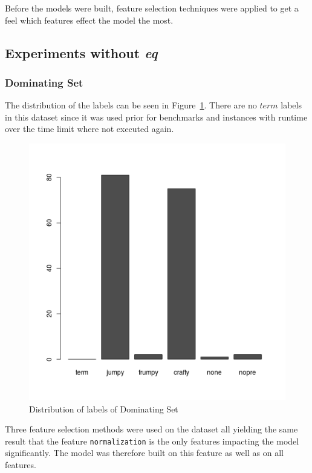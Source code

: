 Before the models were built, feature selection techniques were applied to get a feel which features effect the model the most.

\subsection{Experiments without \emph{eq}}
\subsubsection{Dominating Set}
The distribution of the labels can be seen in Figure~\ref{fig:dsLabelsE1}. There are no $term$ labels in this dataset since it was used prior for benchmarks and instances with runtime over the time limit where not executed again.
\begin{figure}[h]
	\center
	\includegraphics[scale=0.4]{figures/domsetLabelsE1.png}
	\caption{Distribution of labels of Dominating Set\label{fig:dsLabelsE1}}
\end{figure}
\par Three feature selection methods were used on the dataset all yielding the same result that the feature \lstinline$normalization$ is the only features impacting the model significantly. The model was therefore built on this feature as well as on all features.

